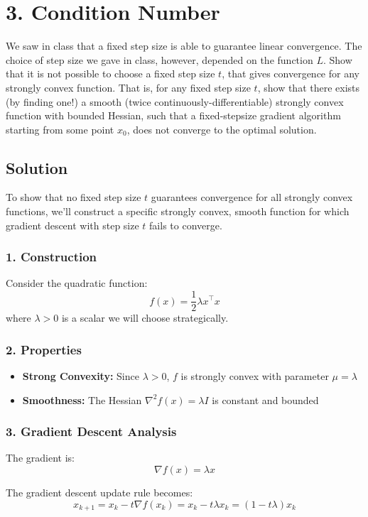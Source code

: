 \documentclass{article}
\begin{document}
\section*{3. Condition Number} 
We saw in class that a fixed step size is able to guarantee linear convergence. The choice of step size we gave in class, however, depended on the function $L$. Show that it is not possible to choose a fixed step size $t$, that gives convergence for any strongly convex function. That is, for any fixed step size $t$, show that there exists (by finding one!) a smooth (twice continuously-differentiable) strongly convex function with bounded Hessian, such that a fixed-stepsize gradient algorithm starting from some point $x_0$, does not converge to the optimal solution.

\subsection*{Solution}

To show that no fixed step size $t$ guarantees convergence for all strongly convex functions, we'll construct a specific strongly convex, smooth function for which gradient descent with step size $t$ fails to converge.

\subsubsection*{1. Construction}
Consider the quadratic function:
\[f(x) = \frac{1}{2} \lambda x^\top x\]
where $\lambda > 0$ is a scalar we will choose strategically.

\subsubsection*{2. Properties}
\begin{itemize}
\item \textbf{Strong Convexity:} Since $\lambda > 0$, $f$ is strongly convex with parameter $\mu = \lambda$
\item \textbf{Smoothness:} The Hessian $\nabla^2 f(x) = \lambda I$ is constant and bounded
\end{itemize}

\subsubsection*{3. Gradient Descent Analysis}
The gradient is:
\[\nabla f(x) = \lambda x\]

The gradient descent update rule becomes:
\[x_{k+1} = x_k - t\nabla f(x_k) = x_k - t\lambda x_k = (1 - t\lambda)x_k\]
\end{document}
